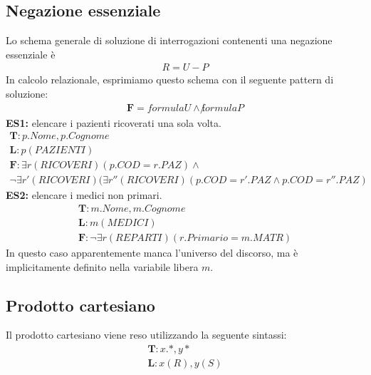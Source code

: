 \subsection{Negazione essenziale}
Lo schema generale di soluzione di interrogazioni contenenti una negazione essenziale è
    \begin{equation}\begin{aligned}
        R = U - P
    \end{aligned}\end{equation}
In calcolo relazionale, esprimiamo questo schema con il seguente pattern di soluzione:
    \begin{equation}\begin{aligned}
        \textbf{F} = formulaU \wedge \not formulaP 
    \end{aligned}\end{equation}
\textbf{ES1:} elencare i pazienti ricoverati una sola volta.
    \begin{equation}\begin{aligned}
        \textbf{T}: p.Nome, p.Cognome\\
        \textbf{L}: p(PAZIENTI)\\
        \textbf{F}: 
        \exists r(RICOVERI) (p.COD = r.PAZ) \wedge \\
        \neg\exists r'(RICOVERI)(\exists r''(RICOVERI) (p.COD = r'.PAZ \wedge p.COD = r''.PAZ)
    \end{aligned}\end{equation}
\textbf{ES2:} elencare i medici non primari.
    \begin{equation}\begin{aligned}
        \textbf{T}: m.Nome, m.Cognome\\
        \textbf{L}: m(MEDICI)\\
        \textbf{F}: \neg \exists r(REPARTI)
        (r.Primario = m.MATR)
    \end{aligned}\end{equation}
In questo caso apparentemente manca l'universo del discorso, ma è implicitamente definito nella variabile libera $m$.

\subsection{Prodotto cartesiano}
Il prodotto cartesiano viene reso utilizzando la seguente sintassi:
    \begin{equation}\begin{aligned}
        \textbf{T}: x.*, y*\\
        \textbf{L}: x(R), y(S)\\
    \end{aligned}\end{equation}

